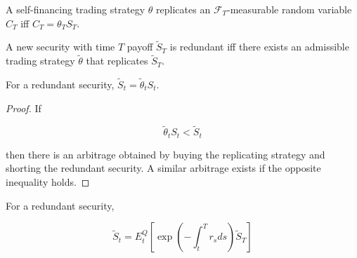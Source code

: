 \documentclass[\topdir/lecture\_notes.tex]{subfiles}
\begin{document}
\begin{defn}\label{def:replicates}
A self-financing trading strategy $\theta$ replicates an $\mathcal{F}_{T}$-measurable random variable $C_{T}$ iff $C_{T}=\theta_{T} S_{T}$.
\end{defn}

\begin{defn}\label{def:redundant_security}
A new security with time $T$ payoff $\tilde{S}_{T}$ is redundant iff there exists an admissible trading strategy $\tilde{\theta}$ that replicates $\tilde{S}_{T}$.
\end{defn}

\begin{proposition}\label{prop:redundant_security_pricing}
For a redundant security, $\tilde{S}_{t}=\tilde{\theta}_{t} S_{t}$.
\end{proposition}

\begin{proof}
If

\begin{equation*}
\tilde{\theta}_{t} S_{t}<\tilde{S}_{t}
\end{equation*}

then there is an arbitrage obtained by buying the replicating strategy and shorting the redundant security. A similar arbitrage exists if the opposite inequality holds.
\end{proof}

\begin{proposition}\label{prop:redundant_security_martingale}
For a redundant security,

\begin{equation*}
\tilde{S}_{t}=E_{t}^{Q}\left[\exp \left(-\int_{t}^{T} r_{s} d s\right) \tilde{S}_{T}\right]
\end{equation*}
\end{proposition}
\end{document}

